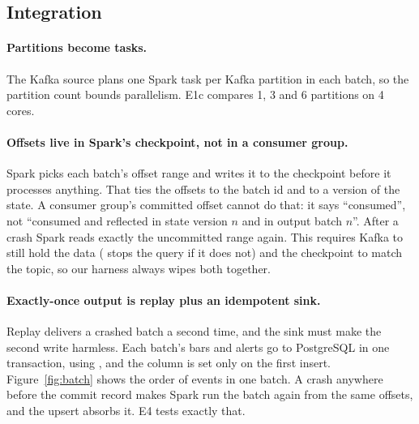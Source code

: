\subsection{Integration}
\label{sec:integration}
\paragraph{Partitions become tasks.} The Kafka source plans one Spark task per Kafka partition in each
batch, so the partition count bounds parallelism. E1c compares 1, 3 and 6 partitions on 4 cores.

\paragraph{Offsets live in Spark's checkpoint, not in a consumer group.} Spark picks each batch's offset
range and writes it to the checkpoint before it processes anything. That ties the offsets to the batch
id and to a version of the state. A consumer group's committed offset cannot do that: it says
``consumed'', not ``consumed and reflected in state version $n$ and in output batch $n$''. After a
crash Spark reads exactly the uncommitted range again. This requires Kafka to still hold the data
( stops the query if it does not) and the checkpoint to match the topic, so our
harness always wipes both together.

\paragraph{Exactly-once output is replay plus an idempotent sink.} Replay delivers a crashed batch a
second time, and the sink must make the second write harmless. Each batch's bars and alerts go to
PostgreSQL in one transaction, using ,
and the  column is set only on the first insert. Figure~\ref{fig:batch} shows the order
of events in one batch. A crash anywhere before the commit record makes Spark run the batch again from
the same offsets, and the upsert absorbs it. E4 tests exactly that.

